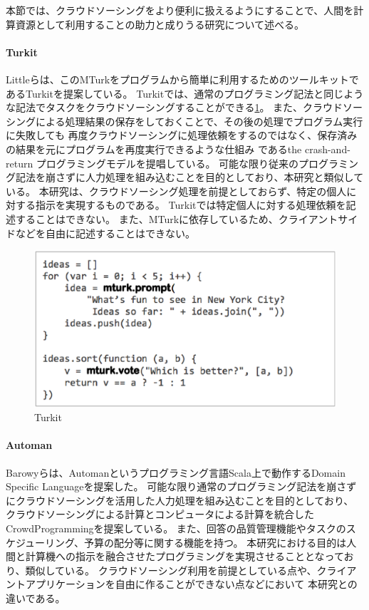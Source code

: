 本節では、クラウドソーシングをより便利に扱えるようにすることで、人間を計算資源として利用することの助力と成りうる研究について述べる。

\paragraph{Turkit}\label{turkit}

\mbox{}

Littleらは、このMTurkをプログラムから簡単に利用するためのツールキットであるTurkit\cite{turkit}を提案している。
Turkitでは、通常のプログラミング記法と同じような記法でタスクをクラウドソーシングすることができる\ref{fig:turkit}。
また、クラウドソーシングによる処理結果の保存をしておくことで、その後の処理でプログラム実行に失敗しても
再度クラウドソーシングに処理依頼をするのではなく、保存済みの結果を元にプログラムを再度実行できるような仕組み
であるthe crash-and-return プログラミングモデルを提唱している。
可能な限り従来のプログラミング記法を崩さずに人力処理を組み込むことを目的としており、本研究と類似している。
本研究は、クラウドソーシング処理を前提としておらず、特定の個人に対する指示を実現するものである。
Turkitでは特定個人に対する処理依頼を記述することはできない。
また、MTurkに依存しているため、クライアントサイドなどを自由に記述することはできない。

\begin{figure}[htbp]
  \begin{center}
  \includegraphics[width=.6\linewidth]{images/turkit.eps}
  \end{center}
  \caption{Turkit}
  \label{fig:turkit}
\end{figure}

\paragraph{Automan}\label{automan}

\mbox{}

Barowyらは、Automanというプログラミング言語Scala上で動作するDomain
Specific Languageを提案した\cite{automan}。
可能な限り通常のプログラミング記法を崩さずにクラウドソーシングを活用した人力処理を組み込むことを目的としており、
クラウドソーシングによる計算とコンピュータによる計算を統合したCrowdProgrammingを提案している。
また、回答の品質管理機能やタスクのスケジューリング、予算の配分等に関する機能を持つ。
本研究における目的は人間と計算機への指示を融合させたプログラミングを実現させることとなっており、類似している。
クラウドソーシング利用を前提としている点や、クライアントアプリケーションを自由に作ることができない点などにおいて
本研究との違いである。

